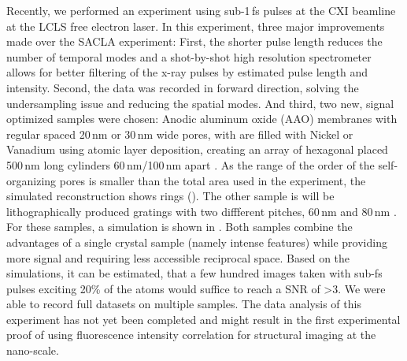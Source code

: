 Recently, we performed an experiment using sub-1\,fs pulses at the CXI beamline at the LCLS free electron laser. In this experiment, three major improvements made over the SACLA experiment: First, the shorter pulse length reduces the number of temporal modes and a shot-by-shot high resolution spectrometer allows for better filtering of the x-ray pulses by estimated pulse length and intensity. Second, the data was recorded in forward direction, solving the undersampling issue and reducing the spatial modes. And third, two new, signal optimized samples were chosen: Anodic aluminum oxide (AAO) membranes with regular spaced 20\,nm or 30\,nm wide pores, with are filled with Nickel or Vanadium using atomic layer deposition, creating an array of hexagonal placed 500\,nm long cylinders 60\,nm/100\,nm apart \cite{carina2019}. As the range of the order of the self-organizing pores is smaller than the total area used in the experiment, the simulated reconstruction shows rings (). 
The other sample is will be lithographically produced gratings with two diffferent pitches, 60\,nm  and 80\,nm \cite{mojarad2015}. For these samples, a simulation is shown in . Both samples combine the advantages of a single crystal sample (namely intense features) while providing more signal and requiring less accessible reciprocal space. 
Based on the simulations, it can be estimated, that a few hundred images taken with sub-fs pulses exciting 20\% of the atoms would suffice to reach a SNR of >3.
We were able to record full datasets on multiple samples. The data analysis of this experiment has not yet been completed and might result in the first experimental proof of using fluorescence intensity correlation for structural imaging at the nano-scale.  



